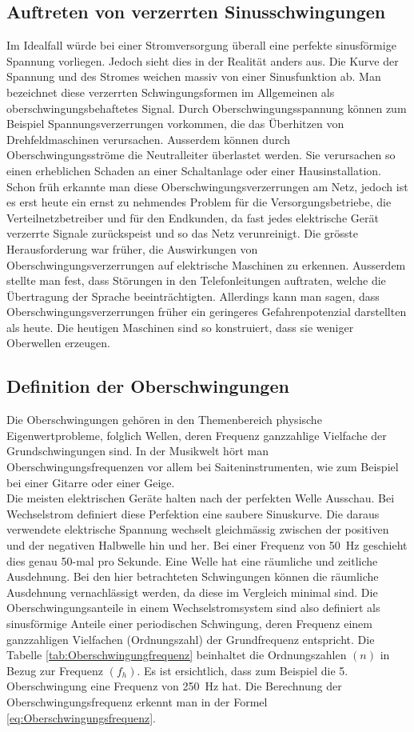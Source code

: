 \subsection{Auftreten von verzerrten Sinusschwingungen}
Im Idealfall würde bei einer Stromversorgung überall eine perfekte sinusförmige Spannung vorliegen. Jedoch sieht dies in der Realität anders aus. Die Kurve der Spannung und des Stromes weichen massiv von einer Sinusfunktion ab. Man bezeichnet diese verzerrten Schwingungsformen im Allgemeinen als oberschwingungsbehaftetes Signal. Durch Oberschwingungsspannung können zum Beispiel Spannungsverzerrungen vorkommen, die das Überhitzen von Drehfeldmaschinen verursachen. Ausserdem können durch Oberschwingungsströme die Neutralleiter überlastet werden. Sie verursachen so einen erheblichen Schaden an einer Schaltanlage oder einer Hausinstallation.\\
Schon früh erkannte man diese Oberschwingungsverzerrungen am Netz, jedoch ist es erst heute ein ernst zu nehmendes Problem für die Versorgungsbetriebe, die Verteilnetzbetreiber und für den Endkunden, da fast jedes elektrische Gerät verzerrte Signale zurückspeist und so das Netz verunreinigt. Die grösste Herausforderung war früher, die Auswirkungen von Oberschwingungsverzerrungen auf elektrische Maschinen zu erkennen. Ausserdem stellte man fest, dass Störungen in den Telefonleitungen auftraten, welche die Übertragung der Sprache beeinträchtigten. Allerdings kann man sagen, dass Oberschwingungsverzerrungen früher ein geringeres Gefahrenpotenzial darstellten als heute. Die heutigen Maschinen sind so konstruiert, dass sie weniger Oberwellen erzeugen.


\newpage
\subsection{Definition der Oberschwingungen}
Die Oberschwingungen gehören in den Themenbereich \grqq physische Eigenwertprobleme\grqq, folglich Wellen, deren Frequenz ganzzahlige Vielfache der Grundschwingungen sind. In der Musikwelt hört man Oberschwingungsfrequenzen vor allem bei Saiteninstrumenten, wie zum Beispiel bei einer Gitarre oder einer Geige.\\
Die meisten elektrischen Geräte halten nach der perfekten Welle Ausschau. Bei Wechselstrom definiert diese Perfektion eine saubere Sinuskurve. Die daraus verwendete elektrische Spannung wechselt gleichmässig zwischen der positiven und der negativen Halbwelle hin und her. Bei einer Frequenz von \SI{50}{Hz} geschieht dies genau 50-mal pro Sekunde. Eine Welle hat eine räumliche und zeitliche Ausdehnung. Bei den hier betrachteten Schwingungen können die räumliche Ausdehnung vernachlässigt werden, da diese im Vergleich minimal sind. Die Oberschwingungsanteile in einem Wechselstromsystem sind also definiert als sinusförmige Anteile einer periodischen Schwingung, deren Frequenz einem ganzzahligen Vielfachen (Ordnungszahl) der Grundfrequenz entspricht. Die Tabelle \ref{tab:Oberschwingungfrequenz} beinhaltet die Ordnungszahlen $(n)$ in Bezug zur Frequenz $(f_h)$. Es ist ersichtlich, dass zum Beispiel die 5. Oberschwingung eine Frequenz von \SI{250}{Hz} hat. Die Berechnung der Oberschwingungsfrequenz erkennt man in der Formel \ref{eq:Oberschwingungsfrequenz}.


